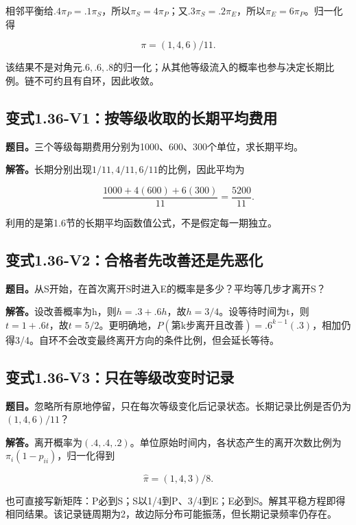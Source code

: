 \documentclass[
  11pt,
  a4paper,
  UTF8,
  fontset=fandol]{ctexart}
\begin{document}
相邻平衡给\(.4\pi_P=.1\pi_S\)，所以\(\pi_S=4\pi_P\)；又\(.3\pi_S=.2\pi_E\)，所以\(\pi_E=6\pi_P\)。归一化得

\[
\boxed{\pi=(1,4,6)/11.}
\]

该结果不是对角元\(.6,.6,.8\)的归一化；从其他等级流入的概率也参与决定长期比例。链不可约且有自环，因此收敛。

\subsection{变式1.36-V1：按等级收取的长期平均费用}\label{ux53d8ux5f0f1.36-v1ux6309ux7b49ux7ea7ux6536ux53d6ux7684ux957fux671fux5e73ux5747ux8d39ux7528}

\textbf{题目。}三个等级每期费用分别为1000、600、300个单位，求长期平均。

\textbf{解答。}长期分别出现\(1/11,4/11,6/11\)的比例，因此平均为

\[
\boxed{\frac{1000+4(600)+6(300)}{11}=\frac{5200}{11}.}
\]

利用的是第1.6节的长期平均函数值公式，不是假定每一期独立。

\subsection{变式1.36-V2：合格者先改善还是先恶化}\label{ux53d8ux5f0f1.36-v2ux5408ux683cux8005ux5148ux6539ux5584ux8fd8ux662fux5148ux6076ux5316}

\textbf{题目。}从S开始，在首次离开S时进入E的概率是多少？平均等几步才离开S？

\textbf{解答。}设改善概率为h，则\(h=.3+.6h\)，故\(h=3/4\)。设等待时间为t，则\(t=1+.6t\)，故\(t=5/2\)。更明确地，\(P(\text{第k步离开且改善})=.6^{k-1}(.3)\)，相加仍得3/4。自环不会改变最终离开方向的条件比例，但会延长等待。

\subsection{变式1.36-V3：只在等级改变时记录}\label{ux53d8ux5f0f1.36-v3ux53eaux5728ux7b49ux7ea7ux6539ux53d8ux65f6ux8bb0ux5f55}

\textbf{题目。}忽略所有原地停留，只在每次等级变化后记录状态。长期记录比例是否仍为\((1,4,6)/11\)？

\textbf{解答。}离开概率为\((.4,.4,.2)\)。单位原始时间内，各状态产生的离开次数比例为\(\pi_i(1-p_{ii})\)，归一化得到

\[
\boxed{\widehat\pi=(1,4,3)/8.}
\]

也可直接写新矩阵：P必到S；S以1/4到P、3/4到E；E必到S。解其平稳方程即得相同结果。该记录链周期为2，故边际分布可能振荡，但长期记录频率仍存在。
\end{document}
